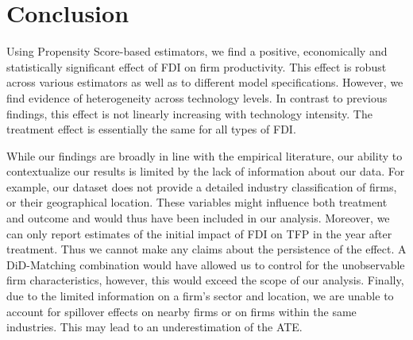 \documentclass[a4paper,11pt]{scrartcl}
\newcommand{\sectionnumbering}[1]{%
  \setcounter{section}{0}%
   \renewcommand{\thesection}{\csname #1\endcsname{section}}}
\begin{document}
\section{Conclusion}

Using Propensity Score-based estimators, we find a positive, economically and statistically significant effect of FDI on firm productivity. This effect is robust across various estimators as well as to different model specifications. However, we find evidence of heterogeneity across technology levels. 
In contrast to previous findings, this effect is not linearly increasing with technology intensity. %
The treatment effect is essentially the same for all types of FDI. 

While our findings are broadly in line with the empirical literature, our ability to contextualize our results is limited by the lack of information about our data. For example, our dataset does not provide a detailed industry classification of firms, or their geographical location. These variables might influence both treatment and outcome and would thus have been included in our analysis. Moreover, we can only report estimates of the initial impact of FDI on TFP in the year after treatment. Thus we cannot make any claims about the persistence of the effect. %
A DiD-Matching combination would have allowed us to control for the %
unobservable firm characteristics, however, this would exceed the scope of our analysis. Finally, due to the limited information on a firm's sector and location, we are unable to account for spillover effects on nearby firms or on firms within the same industries. This may lead to an underestimation of the ATE. 


\newpage

 
\newpage


\sectionnumbering{Roman}
\setcounter{page}{3} %
\end{document}
